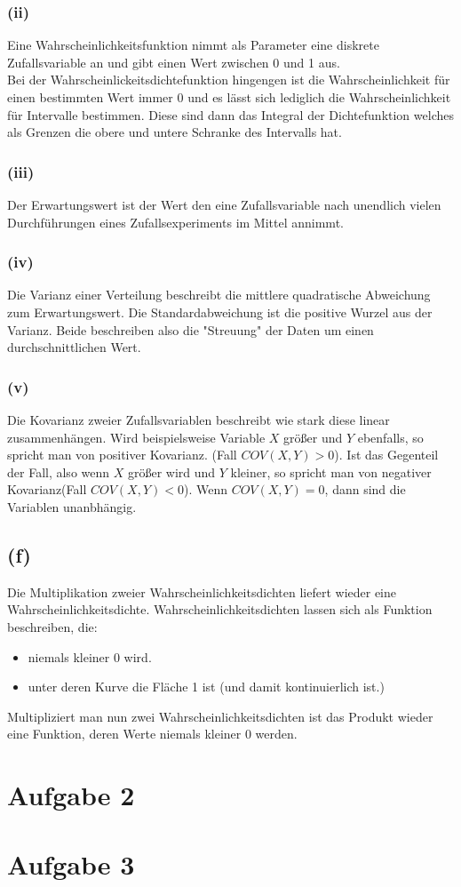 \documentclass[a4paper]{scrartcl}
\begin{document}
\subsubsection*{(ii)}
Eine Wahrscheinlichkeitsfunktion nimmt als Parameter eine diskrete Zufallsvariable an und gibt einen Wert zwischen 0 und 1 aus.\\
Bei der Wahrscheinlickeitsdichtefunktion hingengen ist die Wahrscheinlichkeit für einen bestimmten Wert immer 0 und es lässt sich lediglich die Wahrscheinlichkeit für Intervalle bestimmen. Diese sind dann das Integral der Dichtefunktion welches als Grenzen die obere und untere Schranke des Intervalls hat.

\subsubsection*{(iii)} 
Der Erwartungswert ist der Wert den eine Zufallsvariable nach unendlich vielen Durchführungen eines Zufallsexperiments im Mittel annimmt.

\subsubsection*{(iv)} 
Die Varianz einer Verteilung beschreibt die mittlere quadratische Abweichung zum Erwartungswert. Die Standardabweichung ist die positive Wurzel aus der Varianz. Beide beschreiben also die "Streuung" der Daten um einen durchschnittlichen Wert.

\subsubsection*{(v)} %
Die Kovarianz zweier Zufallsvariablen beschreibt wie stark diese linear zusammenhängen. Wird beispielsweise Variable $X$ größer und $Y$ ebenfalls, so spricht man von positiver Kovarianz. (Fall $COV(X,Y)> 0$). Ist das Gegenteil der Fall, also wenn $X$ größer wird und $Y$ kleiner, so spricht man von negativer Kovarianz(Fall $COV(X,Y) < 0$). Wenn $COV(X,Y)=0$, dann sind die Variablen unanbhängig.



\subsection*{(f)}
Die Multiplikation zweier Wahrscheinlichkeitsdichten liefert wieder eine Wahrscheinlichkeitsdichte. Wahrscheinlichkeitsdichten lassen sich als Funktion beschreiben, die:
\begin{itemize}
	\item niemals kleiner 0 wird.
	\item unter deren Kurve die Fläche 1 ist (und damit kontinuierlich ist.)
\end{itemize}
Multipliziert man nun zwei Wahrscheinlichkeitsdichten ist das Produkt wieder eine Funktion, deren Werte niemals kleiner 0 werden. 


\section*{Aufgabe 2}

\section*{Aufgabe 3}
\end{document}
